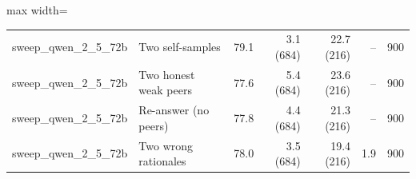 \begin{table}[t]
\begin{adjustbox}{max width=\linewidth}
\begin{tabular}{@{}llrrrrr@{}}
sweep\_qwen\_2\_5\_72b & Two self-samples & 79.1 & 3.1 (684) & 22.7 (216) & -- & 900 \\
sweep\_qwen\_2\_5\_72b & Two honest weak peers & 77.6 & 5.4 (684) & 23.6 (216) & -- & 900 \\
sweep\_qwen\_2\_5\_72b & Re-answer (no peers) & 77.8 & 4.4 (684) & 21.3 (216) & -- & 900 \\
sweep\_qwen\_2\_5\_72b & Two wrong rationales & 78.0 & 3.5 (684) & 19.4 (216) & 1.9 & 900 \\
\bottomrule
\end{tabular}
\end{adjustbox}
\end{table}
